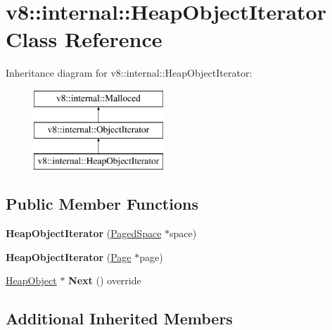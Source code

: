 \hypertarget{classv8_1_1internal_1_1HeapObjectIterator}{}\section{v8\+:\+:internal\+:\+:Heap\+Object\+Iterator Class Reference}
\label{classv8_1_1internal_1_1HeapObjectIterator}
Inheritance diagram for v8\+:\+:internal\+:\+:Heap\+Object\+Iterator\+:\begin{figure}[H]
\begin{center}
\leavevmode
\includegraphics[height=3.000000cm]{classv8_1_1internal_1_1HeapObjectIterator}
\end{center}
\end{figure}
\subsection*{Public Member Functions}
\begin{DoxyCompactItemize}
\item 
\mbox{\label{classv8_1_1internal_1_1HeapObjectIterator_acafe719dc17a39eeb032d27a928c81c1}} 
{\bfseries Heap\+Object\+Iterator} (\mbox{\hyperlink{classv8_1_1internal_1_1PagedSpace}{Paged\+Space}} $\ast$space)
\item 
\mbox{\label{classv8_1_1internal_1_1HeapObjectIterator_a69c2d09f4c5b7a0fdccd4b99f4272d79}} 
{\bfseries Heap\+Object\+Iterator} (\mbox{\hyperlink{classv8_1_1internal_1_1Page}{Page}} $\ast$page)
\item 
\mbox{\label{classv8_1_1internal_1_1HeapObjectIterator_ac7bad85159078acd67a811fc7336d75c}} 
\mbox{\hyperlink{classv8_1_1internal_1_1HeapObject}{Heap\+Object}} $\ast$ {\bfseries Next} () override
\end{DoxyCompactItemize}
\subsection*{Additional Inherited Members}


